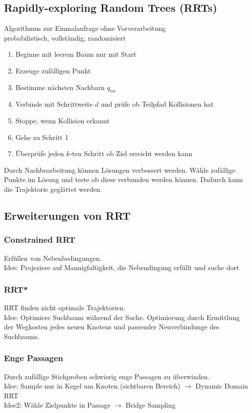 \subsection{Rapidly-exploring Random Trees (RRTs)}
Algorithmus zur Einmalanfrage ohne Vorverarbeitung\\
probabilistisch, vollständig, randomisiert

\begin{enumerate}
\item Beginne mit leerem Baum nur mit Start
\item Erzeuge zufälligen Punkt
\item Bestimme nächsten Nachbarn \(q_{nn}\)
\item Verbinde mit Schrittweite \(d\) und prüfe ob Teilpfad Kollisionen hat
\item Stoppe, wenn Kollision erkannt
\item Gehe zu Schritt 1
\item Überprüfe jeden \(k\)-ten Schritt ob Ziel erreicht werden kann
\end{enumerate}

Durch Nachbearbeitung können Lösungen verbessert werden. Wähle zufällige Punkte im Lösung und teste ob diese
verbunden werden können. Dadurch kann die Trajektorie geglättet werden.

\subsection{Erweiterungen von RRT}
\subsubsection{Constrained RRT}
Erfüllen von Nebenbedingungen.\\
Idee: Projeziere auf Mannigfaltigkeit, die Nebendingung erfüllt und suche dort

\subsubsection{RRT*}
RRT finden nicht optimale Trajektorien.\\
Idee: Optimiere Suchbaum während der Suche. Optimierung durch Ermittlung der Wegkosten jedes neuen Knotens und
passender Neuverbindunge des Suchbaums.

\subsubsection{Enge Passagen}
Durch zufällige Stichproben schwierig enge Passagen zu überwinden.\\
Idee: Sample nur in Kegel um Knoten (sichtbaren Bereich)
\(\rightarrow\) Dynamic Domain RRT\\

Idee2: Wähle Zielpunkte in Passage
\(\rightarrow\) Bridge Sampling\\

